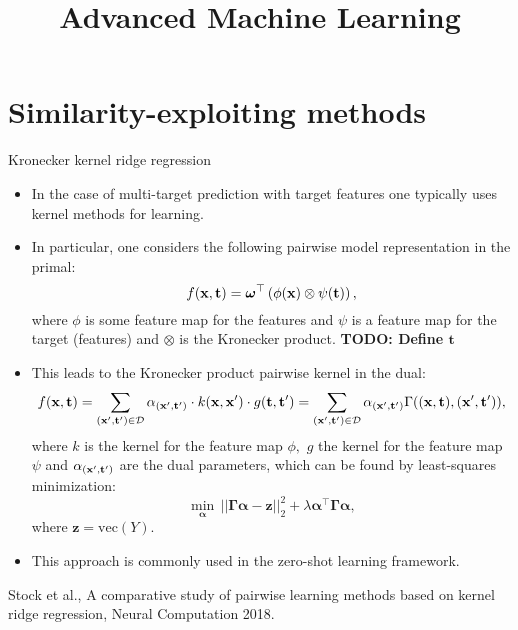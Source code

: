 \documentclass[11pt,compress,t,notes=noshow, xcolor=table]{beamer}
\title{Advanced Machine Learning}
\date{}
\newcommand{\tv}{\mathbf{t}}
\begin{document}



\sloppy

\section{Similarity-exploiting methods}


\begin{frame}{Kronecker kernel ridge regression}
	\footnotesize
	\begin{itemize}
%		
	\item In the case of multi-target prediction with target features one typically uses kernel methods for learning.
%		
	\item In particular, one considers the following pairwise model representation in the primal: 
		\begin{equation*}
			\label{eq:pairwise}
			f(\xv,\tv) = \bm\omega^\top \left(\phi(\xv) \otimes \psi(\tv) \right) ,
		\end{equation*}
%	
	where $\phi$ is some feature map for the features and $\psi$ is a feature map for the target (features) and $\otimes$ is the Kronecker product. \textbf{TODO: Define $\tv$}
%
	\item This leads to the Kronecker product pairwise kernel in the dual:
%	
	\begin{eqnarray*} 
		f(\xv,\tv)= \sum_{(\xv',\tv') \in \D} \alpha_{(\xv',\tv')}  \cdot  k(\xv,\xv') \cdot g(\tv,\tv')  = \sum_{(\xv',\tv') \in \D} \alpha_{(\xv',\tv')} \Gamma((\xv,\tv),(\xv',\tv')),
	\end{eqnarray*}
%
	where $k$ is the kernel for the feature map $\phi,$  $g$ the kernel for the feature map $\psi$  and $\alpha_{(\xv',\tv')}$ are the dual parameters, which can be found by least-squares minimization:
%	 
	$$ \min_{\bm{\alpha}} \, ||\bm{\Gamma}\bm{\alpha} -\bm{z} ||^2_2 +\lambda\bm{\alpha }^\top \bm{\Gamma}\bm{\alpha}, $$
%	
	where $\bm{z} = \mathrm{vec}{(Y)}.$
%
%
	\item This approach is commonly used in the zero-shot learning framework.

%
\end{itemize}
%	
	{\tiny Stock et al., A comparative study of pairwise learning methods based on kernel ridge regression, Neural Computation 2018.}
%	
\end{frame}
\end{document}
